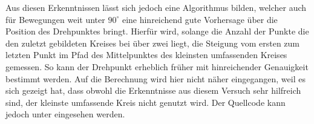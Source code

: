 Aus diesen Erkenntnissen lässt sich jedoch eine Algorithmus bilden, welcher auch für Bewegungen weit unter $90^\circ$ eine hinreichend gute Vorhersage über die Position des Drehpunktes bringt.
Hierfür wird, solange die Anzahl der Punkte die den zuletzt gebildeten Kreises bei über zwei liegt, die Steigung vom ersten zum letzten Punkt im Pfad des Mittelpunktes des kleinsten umfassenden Kreises gemessen.
So kann der Drehpunkt erheblich früher mit hinreichender Genauigkeit bestimmt werden.
Auf die Berechnung wird hier nicht näher eingegangen, weil es sich gezeigt hat, dass obwohl die Erkenntnisse aus diesem Versuch sehr hilfreich sind, der kleinste umfassende Kreis nicht genutzt wird.
Der Quellcode kann jedoch unter %
eingesehen werden.








